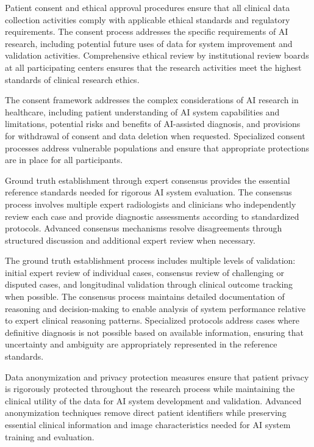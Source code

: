 Patient consent and ethical approval procedures ensure that all clinical data collection activities comply with applicable ethical standards and regulatory requirements. The consent process addresses the specific requirements of AI research, including potential future uses of data for system improvement and validation activities. Comprehensive ethical review by institutional review boards at all participating centers ensures that the research activities meet the highest standards of clinical research ethics.

The consent framework addresses the complex considerations of AI research in healthcare, including patient understanding of AI system capabilities and limitations, potential risks and benefits of AI-assisted diagnosis, and provisions for withdrawal of consent and data deletion when requested. Specialized consent processes address vulnerable populations and ensure that appropriate protections are in place for all participants.

Ground truth establishment through expert consensus provides the essential reference standards needed for rigorous AI system evaluation. The consensus process involves multiple expert radiologists and clinicians who independently review each case and provide diagnostic assessments according to standardized protocols. Advanced consensus mechanisms resolve disagreements through structured discussion and additional expert review when necessary.

The ground truth establishment process includes multiple levels of validation: initial expert review of individual cases, consensus review of challenging or disputed cases, and longitudinal validation through clinical outcome tracking when possible. The consensus process maintains detailed documentation of reasoning and decision-making to enable analysis of system performance relative to expert clinical reasoning patterns. Specialized protocols address cases where definitive diagnosis is not possible based on available information, ensuring that uncertainty and ambiguity are appropriately represented in the reference standards.

Data anonymization and privacy protection measures ensure that patient privacy is rigorously protected throughout the research process while maintaining the clinical utility of the data for AI system development and validation. Advanced anonymization techniques remove direct patient identifiers while preserving essential clinical information and image characteristics needed for AI system training and evaluation.

